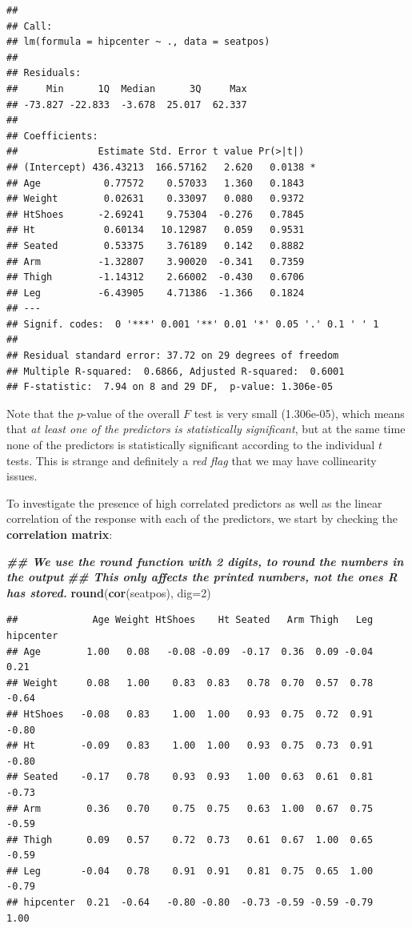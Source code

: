 \documentclass[
]{book}
\newenvironment{Shaded}{\begin{snugshade}}{\end{snugshade}}
\newcommand{\AttributeTok}[1]{\textcolor[rgb]{0.13,0.29,0.53}{#1}}
\newcommand{\DecValTok}[1]{\textcolor[rgb]{0.00,0.00,0.81}{#1}}
\newcommand{\DocumentationTok}[1]{\textcolor[rgb]{0.56,0.35,0.01}{\textbf{\textit{#1}}}}
\newcommand{\FunctionTok}[1]{\textcolor[rgb]{0.13,0.29,0.53}{\textbf{#1}}}
\newcommand{\NormalTok}[1]{#1}
\begin{document}
\begin{verbatim}
## 
## Call:
## lm(formula = hipcenter ~ ., data = seatpos)
## 
## Residuals:
##     Min      1Q  Median      3Q     Max 
## -73.827 -22.833  -3.678  25.017  62.337 
## 
## Coefficients:
##              Estimate Std. Error t value Pr(>|t|)  
## (Intercept) 436.43213  166.57162   2.620   0.0138 *
## Age           0.77572    0.57033   1.360   0.1843  
## Weight        0.02631    0.33097   0.080   0.9372  
## HtShoes      -2.69241    9.75304  -0.276   0.7845  
## Ht            0.60134   10.12987   0.059   0.9531  
## Seated        0.53375    3.76189   0.142   0.8882  
## Arm          -1.32807    3.90020  -0.341   0.7359  
## Thigh        -1.14312    2.66002  -0.430   0.6706  
## Leg          -6.43905    4.71386  -1.366   0.1824  
## ---
## Signif. codes:  0 '***' 0.001 '**' 0.01 '*' 0.05 '.' 0.1 ' ' 1
## 
## Residual standard error: 37.72 on 29 degrees of freedom
## Multiple R-squared:  0.6866, Adjusted R-squared:  0.6001 
## F-statistic:  7.94 on 8 and 29 DF,  p-value: 1.306e-05
\end{verbatim}

Note that the \(p\)-value of the overall \(F\) test is very small (1.306e-05), which means that \emph{at least one of the predictors is statistically significant}, but at the same time none of the predictors is statistically significant according to the individual \(t\) tests. This is strange and definitely a \emph{red flag} that we may have collinearity issues.

To investigate the presence of high correlated predictors as well as the linear correlation of the response with each of the predictors, we start by checking the \textbf{correlation matrix}:

\begin{Shaded}
\begin{Highlighting}[]
\DocumentationTok{\#\# We use the round function with 2 digits, to round the numbers in the output}
\DocumentationTok{\#\# This only affects the printed numbers, not the ones R has stored.}
\FunctionTok{round}\NormalTok{(}\FunctionTok{cor}\NormalTok{(seatpos), }\AttributeTok{dig=}\DecValTok{2}\NormalTok{)}
\end{Highlighting}
\end{Shaded}

\begin{verbatim}
##             Age Weight HtShoes    Ht Seated   Arm Thigh   Leg hipcenter
## Age        1.00   0.08   -0.08 -0.09  -0.17  0.36  0.09 -0.04      0.21
## Weight     0.08   1.00    0.83  0.83   0.78  0.70  0.57  0.78     -0.64
## HtShoes   -0.08   0.83    1.00  1.00   0.93  0.75  0.72  0.91     -0.80
## Ht        -0.09   0.83    1.00  1.00   0.93  0.75  0.73  0.91     -0.80
## Seated    -0.17   0.78    0.93  0.93   1.00  0.63  0.61  0.81     -0.73
## Arm        0.36   0.70    0.75  0.75   0.63  1.00  0.67  0.75     -0.59
## Thigh      0.09   0.57    0.72  0.73   0.61  0.67  1.00  0.65     -0.59
## Leg       -0.04   0.78    0.91  0.91   0.81  0.75  0.65  1.00     -0.79
## hipcenter  0.21  -0.64   -0.80 -0.80  -0.73 -0.59 -0.59 -0.79      1.00
\end{verbatim}
\end{document}

